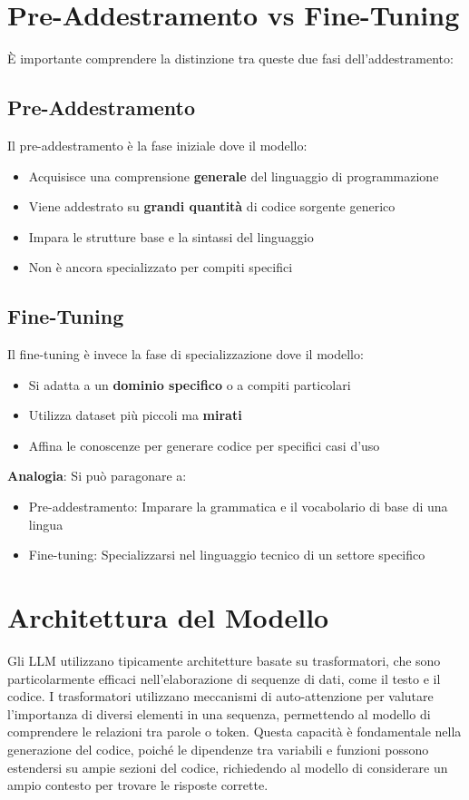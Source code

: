 \documentclass[12pt,a4paper,openright,twoside]{book}
\begin{document}
\section{Pre-Addestramento vs Fine-Tuning}
È importante comprendere la distinzione tra queste due fasi dell'addestramento:
\subsection{Pre-Addestramento}
Il pre-addestramento è la fase iniziale dove il modello:
\begin{itemize}
    \item Acquisisce una comprensione \textbf{generale} del linguaggio di programmazione
    \item Viene addestrato su \textbf{grandi quantità} di codice sorgente generico
    \item Impara le strutture base e la sintassi del linguaggio
    \item Non è ancora specializzato per compiti specifici
\end{itemize}

\subsection{Fine-Tuning}
Il fine-tuning è invece la fase di specializzazione dove il modello:
\begin{itemize}
    \item Si adatta a un \textbf{dominio specifico} o a compiti particolari
    \item Utilizza dataset più piccoli ma \textbf{mirati}
    \item Affina le conoscenze per generare codice per specifici casi d'uso
\end{itemize}

\textbf{Analogia}: Si può paragonare a:
\begin{itemize}
    \item Pre-addestramento: Imparare la grammatica e il vocabolario di base di una lingua
    \item Fine-tuning: Specializzarsi nel linguaggio tecnico di un settore specifico
\end{itemize}

\section{Architettura del Modello}
Gli LLM utilizzano tipicamente architetture basate su trasformatori, che sono particolarmente efficaci nell'elaborazione di sequenze di dati, come il testo e il codice.
I trasformatori utilizzano meccanismi di auto-attenzione per valutare l'importanza di diversi elementi in una sequenza,
permettendo al modello di comprendere le relazioni tra parole o token.
Questa capacità è fondamentale nella generazione del codice, poiché le dipendenze tra variabili e funzioni possono estendersi su ampie sezioni del codice, richiedendo al modello di considerare un ampio contesto per trovare le risposte corrette.
\end{document}
